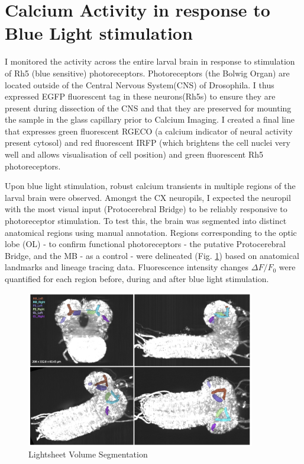 \section{Calcium Activity in response to Blue Light stimulation}
I monitored the activity across the entire larval brain in response to stimulation of Rh5 (blue sensitive) photoreceptors. Photoreceptors (the Bolwig Organ) are located outside of the Central Nervous System(CNS) of Drosophila. I thus expressed EGFP fluorescent tag in these neurons(Rh5s) to ensure they are present during dissection of the CNS and that they are preserved for mounting the sample in the glass capillary prior to Calcium Imaging. I created a final line that expresses green fluorescent RGECO (a calcium indicator of neural activity present cytosol) and red fluorescent IRFP (which brightens the cell nuclei very well and allows visualisation of cell position) and green fluorescent Rh5 photoreceptors. 

Upon blue light stimulation, robust calcium transients in multiple regions of the larval brain were observed. Amongst the CX neuropils, I expected the neuropil with the most visual input (Protocerebral Bridge) to be reliably responsive to photoreceptor stimulation. To test this, the brain was segmented into distinct anatomical regions using manual annotation. Regions corresponding to the optic lobe (OL) - to confirm functional photoreceptors - the putative Protocerebral Bridge, and the MB - as a control -  were delineated (Fig. \ref{LSSegmentation}) based on anatomical landmarks and lineage tracing data. Fluorescence intensity changes $\Delta F/F_0$ were quantified for each region before, during and after blue light stimulation. 

   \begin{figure}
        \centering
        \includegraphics[width=10cm]{Figs/CX/LSSegmentation.pdf}
        \caption[Lightsheet volume Segmentation]{Lightsheet Volume Segmentation}
        \label{LSSegmentation}
    \end{figure}

